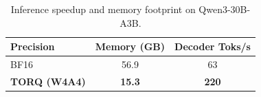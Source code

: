 \begin{table}[h]
\centering
\caption{Inference speedup and memory footprint on Qwen3-30B-A3B.}
\label{tab:speedup}
\begin{tabular}{lcc}
\toprule
\textbf{Precision} & \textbf{Memory (GB)} & \textbf{Decoder Toks/s} \\
\midrule
BF16 & 56.9 & 63 \\
\textbf{TORQ (W4A4)} & \textbf{15.3} & \textbf{220} \\
\bottomrule
\end{tabular}
\end{table}